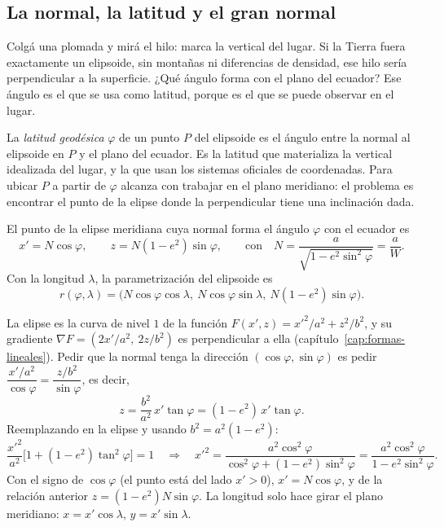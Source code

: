 \subsection{La normal, la latitud y el gran normal}

Colgá una plomada y mirá el hilo: marca la vertical del lugar. Si la Tierra fuera exactamente
un elipsoide, sin montañas ni diferencias de densidad, ese hilo sería perpendicular a la
superficie. ¿Qué ángulo forma con el plano del ecuador? Ese ángulo es el que se usa como
latitud, porque es el que se puede observar en el lugar.

La \emph{latitud geodésica} \(\varphi\) de un punto \(P\) del elipsoide es el ángulo entre la
normal al elipsoide en \(P\) y el plano del ecuador. Es la latitud que materializa la
vertical idealizada del lugar, y la que usan los sistemas oficiales de coordenadas. Para ubicar \(P\) a
partir de \(\varphi\) alcanza con trabajar en el plano meridiano: el problema es encontrar
el punto de la elipse donde la perpendicular tiene una inclinación dada.

\begin{proposicion}\label{prop:elip-punto}
El punto de la elipse meridiana cuya normal forma el ángulo \(\varphi\) con el ecuador es
\[
  x'=N\cos\varphi,\qquad z=N(1-e^2)\sin\varphi,
  \qquad\text{con}\quad N=\frac{a}{\sqrt{1-e^2\sin^2\varphi}}=\frac aW .
\]
Con la longitud \(\lambda\), la parametrización del elipsoide es
\[
  r(\varphi,\lambda)=\bigl(N\cos\varphi\cos\lambda,\ N\cos\varphi\sin\lambda,\ N(1-e^2)\sin\varphi\bigr).
\]
\end{proposicion}

\begin{demostracion}
La elipse es la curva de nivel \(1\) de la función \(F(x',z)=x'^2/a^2+z^2/b^2\), y su gradiente
\(\nabla F=(2x'/a^2,\ 2z/b^2)\) es perpendicular a ella (capítulo~\ref{cap:formas-lineales}).
Pedir que la normal tenga la dirección \((\cos\varphi,\sin\varphi)\) es pedir
\(\dfrac{x'/a^2}{\cos\varphi}=\dfrac{z/b^2}{\sin\varphi}\), es decir,
\[
  z=\frac{b^2}{a^2}\,x'\tan\varphi=(1-e^2)\,x'\tan\varphi .
\]
Reemplazando en la elipse y usando \(b^2=a^2(1-e^2)\):
\[
  \frac{x'^2}{a^2}\bigl[1+(1-e^2)\tan^2\varphi\bigr]=1
  \quad\Longrightarrow\quad
  x'^2=\frac{a^2\cos^2\varphi}{\cos^2\varphi+(1-e^2)\sin^2\varphi}=\frac{a^2\cos^2\varphi}{1-e^2\sin^2\varphi}.
\]
Con el signo de \(\cos\varphi\) (el punto está del lado \(x'>0\)), \(x'=N\cos\varphi\), y de
la relación anterior \(z=(1-e^2)N\sin\varphi\). La longitud solo hace girar el plano
meridiano: \(x=x'\cos\lambda\), \(y=x'\sin\lambda\).
\end{demostracion}

